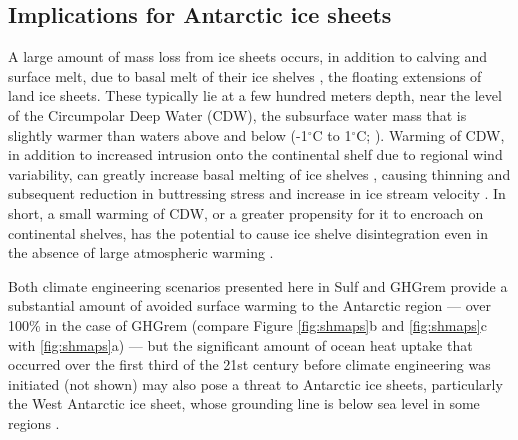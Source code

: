 \documentclass[grl]{AGUTeX}  %
\begin{document}
\begin{article}
\section{Implications for Antarctic ice sheets}
A large amount of mass loss from ice sheets occurs, in addition to calving and surface melt, due to basal melt of their ice shelves \citep{joughin11}, the floating extensions of land ice sheets. These typically lie at a few hundred meters depth, near the level of the Circumpolar Deep Water (CDW), the subsurface water mass that is slightly warmer than waters above and below (-1$^\circ$C to 1$^\circ$C; \cite{yin11}). Warming of CDW, in addition to increased intrusion onto the continental shelf due to regional wind variability, can greatly increase basal melting of ice shelves \citep{joughin11,thoma08}, causing thinning and subsequent reduction in buttressing stress and increase in ice stream velocity \citep{oppenheimer98}. In short, a small warming of CDW, or a greater propensity for it to encroach on continental shelves, has the potential to cause ice shelve disintegration even in the absence of large atmospheric warming \citep{oppenheimer98}. %

Both climate engineering scenarios presented here in Sulf and GHGrem provide a substantial amount of avoided surface warming to the Antarctic region --- over 100\% in the case of GHGrem (compare Figure \ref{fig:shmaps}b and \ref{fig:shmaps}c with \ref{fig:shmaps}a) --- but the significant amount of ocean heat uptake that occurred over the first third of the 21st century before climate engineering was initiated (not shown) may also pose a threat to Antarctic ice sheets, particularly the West Antarctic ice sheet, whose grounding line is below sea level in some regions \citep{joughin11,rignot14}. %


\end{article}
\end{document}
